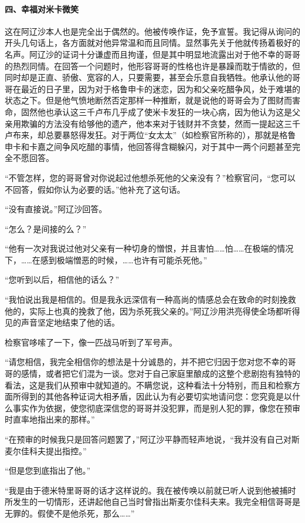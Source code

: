 \paragraph*{四、幸福对米卡微笑}
\par 这在阿辽沙本人也是完全出于偶然的。他被传唤作证，免予宣誓。我记得从询问的开头几句话上，各方面就对他异常温和而且同情。显然事先关于他就传扬着极好的名声。阿辽沙的证词十分谦虚而且拘谨，但是其中明显地流露出对于他不幸的哥哥的热烈同情。在回答一个问题时，他形容哥哥的性格也许是暴躁而耽于情欲的，但同时却是正直、骄傲、宽容的人，只要需要，甚至会乐意自我牺牲。他承认他的哥哥在最近的日子里，因为对于格鲁申卡的迷恋，因为和父亲吃醋争风，处于难堪的状态之下。但是他气愤地断然否定那样一种推断，就是说他的哥哥会为了图财而害命，固然他也承认这三千卢布几乎成了使米卡发狂的一块心病，因为他认为这是父亲用欺骗的方法没有给够他的遗产，他本来对于钱财并不贪婪，然而一提起这三千卢布来，却总要暴怒得发狂。对于两位“女太太”（如检察官所称的），那就是格鲁申卡和卡嘉之间争风吃醋的事情，他回答得含糊躲闪，对于其中一两个问题甚至完全不愿回答。
\par “不管怎样，您的哥哥曾对你说起过他想杀死他的父亲没有？”检察官问，“您可以不回答，假如你认为必要的话。”他补充了这句话。
\par “没有直接说。”阿辽沙回答。
\par “怎么？是间接的么？”
\par “他有一次对我说过他对父亲有一种切身的憎恨，并且害怕……怕……在极端的情况下，……在感到极端憎恶的时候，……也许有可能杀死他。”
\par “您听到以后，相信他的话么？”
\par “我怕说出我是相信的。但是我永远深信有一种高尚的情感总会在致命的时刻挽救他的，实际上也真的挽救了他，因为杀死我父亲的。”阿辽沙用洪亮得使全场都听得见的声音坚定地结束了他的话。
\par 检察官哆嗦了一下，像一匹战马听到了军号声。
\par “请您相信，我完全相信你的想法是十分诚恳的，并不把它归因于您对您不幸的哥哥的感情，或者把它们混为一谈。您对于自己家庭里酿成的这整个悲剧抱有独特的看法，这是我们从预审中就知道的。不瞒您说，这种看法十分特别，而且和检察方面所得到的其他各种证词大相矛盾，因此认为有必要切实地请问您：您究竟是以什么事实作为依据，使您彻底深信您的哥哥并没犯罪，而是别人犯的罪，像您在预审时直率地指出来的那样。”
\par “在预审的时候我只是回答问题罢了，”阿辽沙平静而轻声地说，“我并没有自己对斯麦尔佳科夫提出指控。”
\par “但是您到底指出了他。”
\par “我是由于德米特里哥哥的话才这样说的。我在被传唤以前就已听人说到他被捕时所发生的一切情形，还讲起他自己当时曾指出斯麦尔佳科夫来。我完全相信哥哥是无罪的。假使不是他杀死，那么……”
